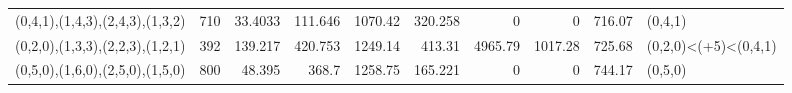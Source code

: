 \begin{tabular}{lrrrrrrrrl}
 (0,4,1),(1,4,3),(2,4,3),(1,3,2) &        710 &                           33.4033 &                        111.646  &                          1070.42  &                         320.258 &                              0    &                           0     &     716.07 & (0,4,1)                 \\
 (0,2,0),(1,3,3),(2,2,3),(1,2,1) &        392 &                          139.217  &                        420.753  &                          1249.14  &                         413.31  &                           4965.79 &                        1017.28  &     725.68 & (0,2,0)<(+5)<(0,4,1)    \\
 (0,5,0),(1,6,0),(2,5,0),(1,5,0) &        800 &                           48.395  &                        368.7    &                          1258.75  &                         165.221 &                              0    &                           0     &     744.17 & (0,5,0)                 \\
\hline
\end{tabular}